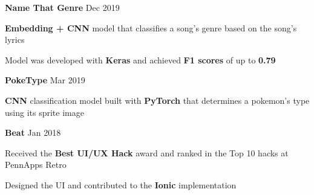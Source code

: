 



\begin{cventries}


\cventry
{\textbf{Name That Genre}}
{Dec 2019} %
{ %
\begin{cvitems}
\item {\textbf{Embedding + CNN} model that classifies a song's genre based on the song's lyrics}
\item {Model was developed with \textbf{Keras} and achieved \textbf{F1 scores} of up to \textbf{0.79}}
\end{cvitems}
}


\cventry
{\textbf{PokeType}}
{Mar 2019} %
{ %
\begin{cvitems}
\item {\textbf{CNN} classification model built with \textbf{PyTorch} that determines a pokemon's type using its sprite image}
\end{cvitems}
}


\cventry
{\textbf{Beat}}
{Jan 2018} %
{ %
\begin{cvitems}
\item {Received the \textbf{Best UI/UX Hack} award and ranked in the Top 10 hacks at PennApps Retro}
\item {Designed the UI and contributed to the \textbf{Ionic} implementation}
\end{cvitems}
}


\end{cventries}
